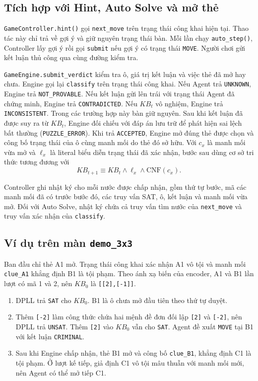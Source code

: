 \subsection{Tích hợp với Hint, Auto Solve và mở thẻ}

\texttt{GameController.hint()} gọi \texttt{next\_move} trên trạng thái công
khai hiện tại. Thao tác này chỉ trả về gợi ý và giữ nguyên trạng thái bàn.
Mỗi lần chạy \texttt{auto\_step()}, Controller lấy gợi ý rồi gọi
\texttt{submit} nếu gợi ý có trạng thái \texttt{MOVE}. Người chơi gửi kết
luận thủ công qua cùng đường kiểm tra.

\texttt{GameEngine.submit\_verdict} kiểm tra ô, giá trị kết luận và việc
thẻ đã mở hay chưa. Engine gọi lại \texttt{classify} trên trạng thái công
khai. Nếu Agent trả \texttt{UNKNOWN}, Engine trả \texttt{NOT\_PROVABLE}.
Nếu kết luận gửi lên trái với trạng thái Agent đã chứng minh, Engine trả
\texttt{CONTRADICTED}. Nếu $KB_t$ vô nghiệm, Engine trả
\texttt{INCONSISTENT}. Trong các trường hợp này bàn giữ nguyên. Sau khi
kết luận đã được suy ra từ $KB_t$, Engine đối chiếu với đáp án lưu trữ để
phát hiện sai lệch bất thường (\texttt{PUZZLE\_ERROR}). Khi trả
\texttt{ACCEPTED}, Engine mở đúng thẻ được chọn và công bố trạng thái của
ô cùng manh mối do thẻ đó sở hữu. Với $c_x$ là manh mối vừa mở và $\ell_x$
là literal biểu diễn trạng thái đã xác nhận, bước sau dùng cơ sở tri thức
tương đương với
\[
KB_{t+1} \equiv KB_t \land \ell_x \land \mathrm{CNF}(c_x).
\]

Controller ghi nhật ký cho mỗi nước được chấp nhận, gồm thứ tự bước, mã
các manh mối đã có trước bước đó, các truy vấn SAT, ô, kết luận và manh mối
vừa mở. Đối với Auto Solve, nhật ký chứa cả truy vấn tìm nước của
\texttt{next\_move} và truy vấn xác nhận của \texttt{classify}.

\subsection{Ví dụ trên màn \texttt{demo\_3x3}}

Ban đầu chỉ thẻ A1 mở. Trạng thái công khai xác nhận A1 vô tội và manh mối
\texttt{clue\_A1} khẳng định B1 là tội phạm. Theo ánh xạ biến của encoder,
A1 và B1 lần lượt có mã 1 và 2, nên $KB_0$ là \texttt{[[2],[-1]]}.
\begin{enumerate}
    \item DPLL trả \texttt{SAT} cho $KB_0$. B1 là ô chưa mở đầu tiên theo
    thứ tự duyệt.
    \item Thêm \texttt{[-2]} làm công thức chứa hai mệnh đề đơn đối lập
    \texttt{[2]} và \texttt{[-2]}, nên DPLL trả \texttt{UNSAT}. Thêm
    \texttt{[2]} vào $KB_0$ vẫn cho \texttt{SAT}. Agent đề xuất
    \texttt{MOVE} tại B1 với kết luận \texttt{CRIMINAL}.
    \item Sau khi Engine chấp nhận, thẻ B1 mở và công bố
    \texttt{clue\_B1}, khẳng định C1 là tội phạm. Ở lượt kế tiếp, giả định
    C1 vô tội mâu thuẫn với manh mối mới, nên Agent có thể mở tiếp C1.
\end{enumerate}

